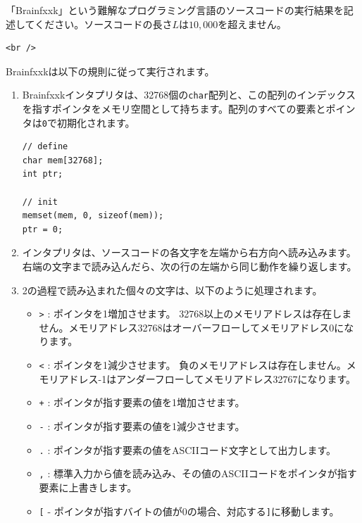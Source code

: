 
「Brainfxxk」という難解なプログラミング言語のソースコードの実行結果を記述してください。ソースコードの長さ$L$は$10,000$を超えません。

\begin{lstlisting}
<br />
\end{lstlisting}

Brainfxxkは以下の規則に従って実行されます。

\begin{enumerate}
\item 
Brainfxxkインタプリタは、32768個の\texttt{char}配列と、この配列のインデックスを指すポインタをメモリ空間として持ちます。配列のすべての要素とポインタは\texttt{0}で初期化されます。

\begin{lstlisting}
// define
char mem[32768];
int ptr;

// init
memset(mem, 0, sizeof(mem));
ptr = 0;
\end{lstlisting}

\item 
インタプリタは、ソースコードの各文字を左端から右方向へ読み込みます。右端の文字まで読み込んだら、次の行の左端から同じ動作を繰り返します。


\item 
2の過程で読み込まれた個々の文字は、以下のように処理されます。

\begin{itemize}
\item 
\texttt{>} : ポインタを1増加させます。
32768以上のメモリアドレスは存在しません。メモリアドレス32768はオーバーフローしてメモリアドレス0になります。


\item 
\texttt{<} : ポインタを1減少させます。
負のメモリアドレスは存在しません。メモリアドレス-1はアンダーフローしてメモリアドレス32767になります。


\item 
\texttt{+} : ポインタが指す要素の値を1増加させます。


\item 
\texttt{-} : ポインタが指す要素の値を1減少させます。


\item 
\texttt{.} : ポインタが指す要素の値をASCIIコード文字として出力します。


\item 
\texttt{,} : 標準入力から値を読み込み、その値のASCIIコードをポインタが指す要素に上書きします。


\item 
\texttt{[} - ポインタが指すバイトの値が0の場合、対応する\texttt{]}に移動します。



\end{itemize}
\end{enumerate}
